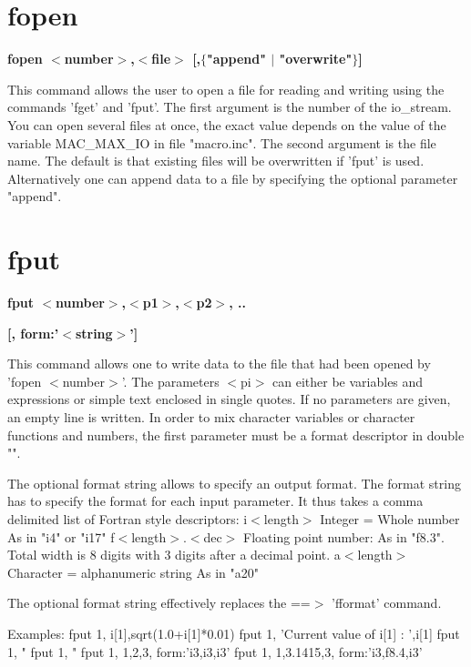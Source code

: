 \section{fopen}
{\bf fopen $ <$number$> $,$ <$file$> $ [,$ \{$"append" $| $ "overwrite"$\} $] \par }
\par
\vspace{3pt}
This command allows the user to open a file for reading and writing 
using the commands 'fget' and 'fput'. The first argument is the number 
of the io\_stream. You can open several files at once, the exact value 
depends on the value of the variable MAC\_MAX\_IO in file "macro.inc". 
The second argument is the file name. The default is that existing 
files will be overwritten if 'fput' is used. Alternatively one can 
append data to a file by specifying the optional parameter "append". 
\section{fput}
{\bf fput $ <$number$> $,$ <$p1$> $,$ <$p2$> $, .. \par }
{\bf               [, form:'$ <$string$> $'] \par }
\par
\vspace{3pt}
This command allows one to write data to the file that had been opened 
by 'fopen $ <$number$> $'. The parameters $ <$pi$> $ can either be variables and 
expressions or simple text enclosed in single quotes. If no parameters 
are given, an empty line is written. 
In order to mix character variables or character functions and numbers, 
the first parameter must be a format descriptor in double "". 
\par
The optional format string allows to specify an output format. 
The format string has to specify the format for each input parameter. 
It thus takes a comma delimited list of Fortran style descriptors: 
i$ <$length$> $         Integer = Whole number 
                  As in "i4"  or "i17" 
f$ <$length$> $.$ <$dec$> $   Floating point number: 
                  As in "f8.3". Total width is 8 digits with 3 
                                digits after a decimal point. 
a$ <$length$> $         Character = alphanumeric string 
                  As in "a20" 
\par
The optional format string effectively replaces the 
==$> $ 'fformat' command. 
\par
\begin{MacVerbatim}
Examples:  fput 1, i[1],sqrt(1.0+i[1]*0.01)
           fput 1, 'Current value of i[1] : ',i[1]
           fput 1, "%
           fput 1, "%
           fput 1, 1,2,3, form:'i3,i3,i3'
           fput 1, 1,3.1415,3, form:'i3,f8.4,i3'
\end{MacVerbatim}
